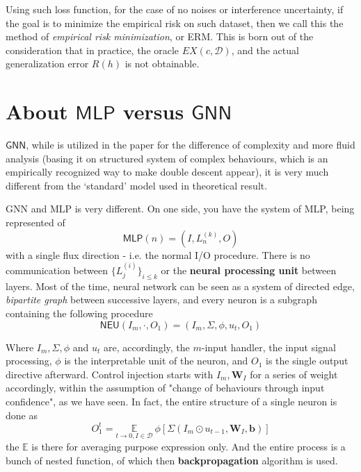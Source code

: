 \documentclass{article}
\begin{document}
Using such loss function, for the case of no noises or interference uncertainty, if the goal is to minimize the empirical risk on such dataset, then we call this the method of \textit{empirical risk minimization}, or ERM. This is born out of the consideration that in practice, the oracle $EX(c,\mathcal{D})$, and the actual generalization error $R(h)$ is not obtainable. 

\section{About $\mathsf{MLP}$ versus $\mathsf{GNN}$}

$\mathsf{GNN}$, while is utilized in the paper for the difference of complexity and more fluid analysis (basing it on structured system of complex behaviours, which is an empirically recognized way to make double descent appear), it is very much different from the `standard' model used in theoretical result. 

GNN and MLP is very different. On one side, you have the system of MLP, being represented of $$\mathsf{MLP}(n)=(I,L^{(k)}_{n}, O)$$
with a single flux direction - i.e. the normal I/O procedure. There is no communication between $\{ L^{(i)}_{j} \}_{i\leq k}$ or the \textbf{neural processing unit} between layers. Most of the time, neural network can be seen as a system of directed edge, \textit{bipartite graph} between successive layers, and every neuron is a subgraph containing the following procedure $$\mathsf{NEU}(I_{{m}}, \cdot, O_{1})= (I_{m}, \Sigma, \phi, u_{t}, O_{1})$$

Where $I_{m}, \Sigma,\phi$ and $u_{t}$ are, accordingly, the $m$-input handler, the input signal processing, $\phi$ is the interpretable unit of the neuron, and $O_{1}$ is the single output directive afterward. Control injection starts with $I_{m},\mathbf{W}_{I}$ for a series of weight accordingly, within the assumption of "change of behaviours through input confidence", as we have seen. In fact, the entire structure of a single neuron is done as $$O_{1}^{t}=\underset{t\to 0, I\in \mathcal{D}}{\mathbb{E}}\:\phi[\Sigma(I_{m} \odot u_{t-1}, \mathbf{W}_{{I}}, \mathbf{b})]$$
the $\mathbb{E}$ is there for averaging purpose expression only. And the entire process is a bunch of nested function, of which then \textbf{backpropagation} algorithm is used. 
\end{document}
